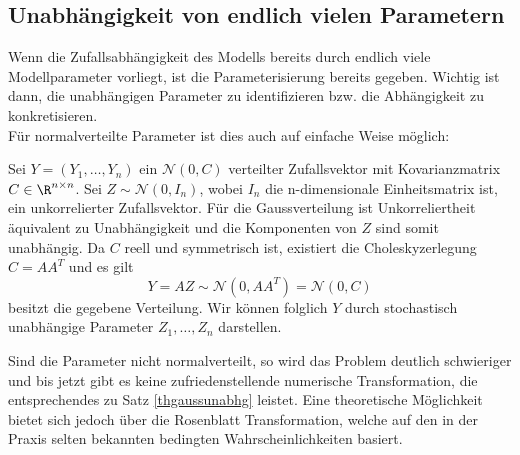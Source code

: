 \subsection{Unabhängigkeit von endlich vielen Parametern}
Wenn die Zufallsabhängigkeit des Modells bereits durch endlich viele Modellparameter vorliegt, ist die Parameterisierung bereits gegeben. Wichtig ist dann, die unabhängigen Parameter zu identifizieren bzw. die Abhängigkeit zu konkretisieren.\\
Für normalverteilte Parameter ist dies auch auf einfache Weise möglich:
\begin{maththeorem}
\label{thgaussunabhg}
Sei $Y=(Y_1,\dots,Y_n)$ ein $\mathcal{N}(0,C)$ verteilter Zufallsvektor mit Kovarianzmatrix $C\in\R^{n\times n}$. Sei $Z\sim\mathcal{N}(0,I_n)$, wobei $I_n$ die n-dimensionale Einheitsmatrix ist, ein unkorrelierter Zufallsvektor. Für die Gaussverteilung ist Unkorreliertheit äquivalent zu Unabhängigkeit und die Komponenten von $Z$ sind somit unabhängig. Da $C$ reell und symmetrisch ist, existiert die Choleskyzerlegung $C=AA^T$ und es gilt
\[Y=AZ\sim\mathcal{N}(0,AA^T)=\mathcal{N}(0,C)\]
besitzt die gegebene Verteilung. Wir können folglich $Y$ durch stochastisch unabhängige Parameter $Z_1,\dots,Z_n$ darstellen.
\end{maththeorem}
Sind die Parameter nicht normalverteilt, so wird das Problem deutlich schwieriger und bis jetzt gibt es keine zufriedenstellende numerische Transformation, die entsprechendes zu Satz \ref{thgaussunabhg} leistet. Eine theoretische Möglichkeit bietet sich jedoch über die Rosenblatt Transformation, welche auf den in der Praxis selten bekannten bedingten Wahrscheinlichkeiten basiert.

